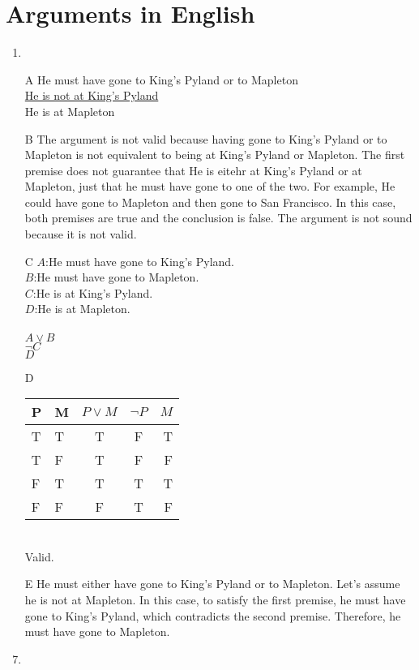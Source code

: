\documentclass{article}
\begin{document}
	\section{Arguments in English}
	\begin{enumerate}
		\item
		\item[A]
			He must have gone to King's Pyland or to Mapleton
			\\\underline{He is not at King's Pyland}
			\\He is at Mapleton
		\item[B]
			The argument is not valid because having gone to King's Pyland or to Mapleton is not equivalent to being at King's Pyland or Mapleton. The first premise does not guarantee that He is eitehr at King's Pyland or at Mapleton, just that he must have gone to one of the two. For example, He could have gone to Mapleton and then gone to San Francisco. In this case, both premises are true and the conclusion is false. The argument is not sound because it is not valid.\\
		\item[C]
			$A$:He must have gone to King's Pyland.\\
			$B$:He must have gone to Mapleton.\\
			$C$:He is at King's Pyland.\\
			$D$:He is at Mapleton.\\
			\\
			$A \lor B$\\
			\underline{$\lnot C$}\\
			$D$
		\item[D]
			\begin{tabular}{l | l || c | c || r}
				P & M & $P \lor M$ & $\lnot P$ & $M$\\ \hline
				T & T & T & F & T\\
				T & F & T & F & F\\
				F & T & T & T & T\\
				F & F & F & T & F\\
			\end{tabular}
			\\Valid.
			\\
		\item[E]
			He must either have gone to King's Pyland or to Mapleton. Let's assume he is not at Mapleton. In this case, to satisfy the first premise, he must have gone to King's Pyland, which contradicts the second premise. Therefore, he must have gone to Mapleton.
		\item

\end{enumerate}
\end{document}
